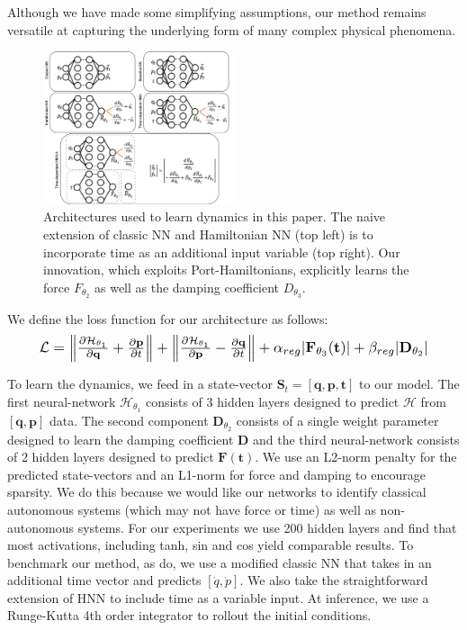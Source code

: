 \documentclass[twoside]{article}
\begin{document}
Although we have made some simplifying assumptions, our method remains versatile at capturing the underlying form of many complex physical phenomena. 

\begin{figure}[h!]
\centering
\includegraphics[width=0.5\textwidth]{figures/architect.png}
\caption{Architectures used to learn dynamics in this paper. The naive extension of classic NN and Hamiltonian NN (top left) is to incorporate time as an additional input variable (top right). Our innovation, which exploits Port-Hamiltonians, explicitly learns the force $F_{\theta_2}$ as well as the damping coefficient $D_{\theta_3}$.}
\label{fig.architecture}
\end{figure}

We define the loss function for our architecture as follows:
\begin{equation}
\resizebox{0.9\linewidth}{!}{$%
\mathcal{L} =\left\| \frac{\partial \mathcal{H}_{\theta_1}}{\partial \mathbf{q}} +  \frac{\partial \mathbf{p}}{\partial t} \right\| +\left\| \frac{\partial \mathcal{H}_{\theta_1}}{\partial \mathbf{p}} -  \frac{\partial \mathbf{q}}{\partial t} \right\|+ \alpha_{reg}| \mathbf{F}_{\theta_3} (\mathbf{t})| + \beta_{reg}|\mathbf{D}_{\theta_2}| 
$%
}
\end{equation}

To learn the dynamics, we feed in a state-vector $\mathbf{S}_t = [\mathbf{q},\mathbf{p},\mathbf{t}]$ to our model. The first neural-network $\mathcal{H}_{\theta_1}$ consists of 3 hidden layers designed to predict $\mathcal{H}$ from $[\mathbf{q},\mathbf{p}]$ data. The second component $\mathbf{D}_{\theta_2}$ consists of a single weight parameter designed to learn the damping coefficient $\mathbf{D}$ and the third neural-network consists of 2 hidden layers designed to predict $\mathbf{F(\mathbf{t})}$. We use an L2-norm penalty for the predicted state-vectors and an L1-norm for force and damping to encourage sparsity. We do this because we would like our networks to identify classical autonomous systems (which may not have force or time) as well as non-autonomous systems. For our experiments we use 200 hidden layers and find that most activations, including tanh, sin and cos yield comparable results. To benchmark our method, as \cite{greydanus_hamiltonian_2019} do, we use a modified classic NN that takes in an additional time vector and predicts $[\dot{q},\dot{p}]$. We also take the straightforward extension of HNN to include time as a variable input. At inference, we use a Runge-Kutta 4th order integrator to rollout the initial conditions. 
\end{document}
